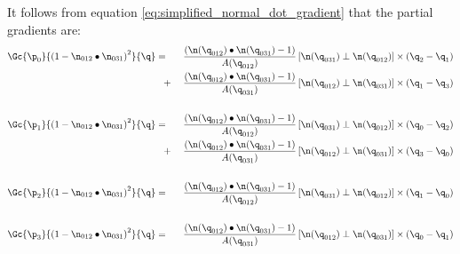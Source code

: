 It follows from equation \ref{eq:simplified_normal_dot_gradient}
that the partial gradients are:
\begin{eqnarray}
\label{eq:squared_normal_dot_gradient}
\Gc{\p_0}{\left(1 - \n_{012} \bullet \n_{031}\right)^2}{\q}
& = \;\;\; &
\frac{\left( \n(\q_{012}) \bullet \n(\q_{031}) - 1\right)
}
{A(\q_{012}) }
\left[ \n(\q_{031}) \perp \n(\q_{012}) \right]
\times (\q_2 - \q_1)
\\
& \;\;\; + &
\frac{\left( \n(\q_{012}) \bullet \n(\q_{031}) - 1\right)
}{A(\q_{031})}
\left[ \n(\q_{012}) \perp \n(\q_{031}) \right]
\times (\q_1 - \q_3)
\nonumber \\
& & \nonumber \\
\Gc{\p_1}{\left(1 - \n_{012} \bullet \n_{031}\right)^2}{\q}
& = \;\;\; &
\frac{\left( \n(\q_{012}) \bullet \n(\q_{031}) - 1\right)
}{A(\q_{012})}
\left[ \n(\q_{031}) \perp \n(\q_{012}) \right]
\times (\q_0 - \q_2)
\nonumber \\
& \;\;\; + &
\frac{\left( \n(\q_{012}) \bullet \n(\q_{031}) - 1\right)
}{A(\q_{031})}
\left[ \n(\q_{012}) \perp \n(\q_{031}) \right]
\times (\q_3 - \q_0)
\nonumber \\
& & \nonumber \\
\Gc{\p_2}{\left(1 - \n_{012} \bullet \n_{031}\right)^2}{\q}
& = \;\;\; &
\frac{\left( \n(\q_{012}) \bullet \n(\q_{031}) - 1\right)
}{A(\q_{012})}
\left[ \n(\q_{031}) \perp \n(\q_{012}) \right]
\times (\q_1 - \q_0)
\nonumber \\
& & \nonumber \\
\Gc{\p_3}{\left(1 - \n_{012} \bullet \n_{031}\right)^2}{\q}
& = \;\;\; &
\frac{\left( \n(\q_{012}) \bullet \n(\q_{031}) - 1\right)
}{A(\q_{031})}
\left[ \n(\q_{012}) \perp \n(\q_{031}) \right]
\times (\q_0 - \q_1)
\nonumber
\end{eqnarray}

